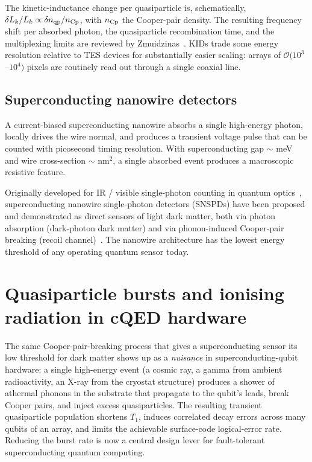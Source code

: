 The kinetic-inductance change per quasiparticle is, schematically,
$\delta L_k/L_k\propto \delta n_{\rm qp}/n_{\rm Cp}$, with
$n_{\rm Cp}$ the Cooper-pair density. The resulting frequency
shift per absorbed photon, the quasiparticle recombination time,
and the multiplexing limits are reviewed by
Zmuidzinas~\cite{zmuidzinas2012}. KIDs trade some energy
resolution relative to TES devices for substantially easier
scaling: arrays of $\mathcal O(10^3$--$10^4)$ pixels are routinely
read out through a single coaxial line.

\subsection{Superconducting nanowire detectors}
\label{sec:snspd}

\begin{phenomenon}
A current-biased superconducting nanowire absorbs a single
high-energy photon, locally drives the wire normal, and produces
a transient voltage pulse that can be counted with picosecond
timing resolution. With superconducting gap $\sim$ meV and wire
cross-section $\sim$ nm$^2$, a single absorbed event produces a
macroscopic resistive feature.
\end{phenomenon}

Originally developed for IR / visible single-photon counting in
quantum optics~\cite{natarajan2012}, superconducting nanowire
single-photon detectors (SNSPDs) have been proposed and
demonstrated as direct sensors of light dark matter, both via
photon absorption (dark-photon dark matter) and via phonon-induced
Cooper-pair breaking (recoil channel)~\cite{hochberg2021}. The
nanowire architecture has the lowest energy threshold of any
operating quantum sensor today.

\section{Quasiparticle bursts and ionising radiation in cQED hardware}
\label{sec:qp-cqed}

\begin{phenomenon}
The same Cooper-pair-breaking process that gives a superconducting
sensor its low threshold for dark matter shows up as a
\emph{nuisance} in superconducting-qubit hardware: a single
high-energy event (a cosmic ray, a gamma from ambient
radioactivity, an X-ray from the cryostat structure) produces a
shower of athermal phonons in the substrate that propagate to the
qubit's leads, break Cooper pairs, and inject excess
quasiparticles. The resulting transient quasiparticle population
shortens $T_1$, induces correlated decay errors across many qubits
of an array, and limits the achievable surface-code logical-error
rate.  Reducing the burst rate is now a central design lever for
fault-tolerant superconducting quantum computing.
\end{phenomenon}

